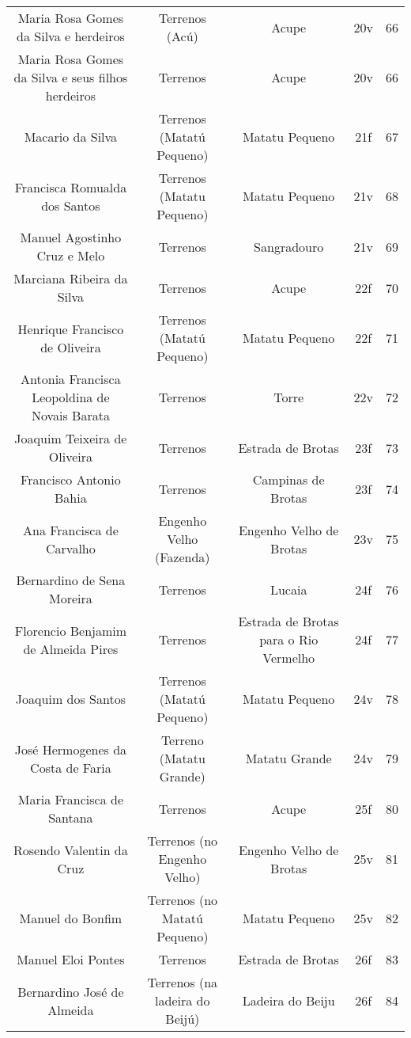 \begin{table}[!htp]
{\begin{tiny}
\begin{tabular}{ccccc}
Maria Rosa Gomes da Silva e herdeiros						&Terrenos (Acú)				&Acupe					&20v			&66			&\\
Maria Rosa Gomes da Silva e seus filhos herdeiros				&Terrenos				&Acupe					&20v			&66			&\\
Macario da Silva								&Terrenos (Matatú Pequeno)		&Matatu Pequeno				&21f			&67			&\\
Francisca Romualda dos Santos							&Terrenos (Matatu Pequeno)		&Matatu Pequeno				&21v			&68			&\\
Manuel Agostinho Cruz e Melo							&Terrenos				&Sangradouro				&21v			&69			&\\
Marciana Ribeira da Silva							&Terrenos				&Acupe					&22f			&70			&\\
Henrique Francisco de Oliveira							&Terrenos (Matatú Pequeno)		&Matatu Pequeno				&22f			&71			&\\
Antonia Francisca Leopoldina de Novais Barata					&Terrenos				&Torre					&22v			&72			&\\
Joaquim Teixeira de Oliveira							&Terrenos				&Estrada de Brotas			&23f			&73			&\\
Francisco Antonio Bahia								&Terrenos				&Campinas de Brotas			&23f			&74			&\\
Ana Francisca de Carvalho							&Engenho Velho (Fazenda)		&Engenho Velho de Brotas		&23v			&75			&\\
Bernardino de Sena Moreira							&Terrenos				&Lucaia					&24f			&76			&\\
Florencio Benjamim de Almeida Pires						&Terrenos				&Estrada de Brotas para o Rio Vermelho	&24f			&77			&\\
Joaquim dos Santos								&Terrenos (Matatú Pequeno)		&Matatu Pequeno				&24v			&78			&\\
José Hermogenes da Costa de Faria						&Terreno (Matatu Grande)		&Matatu Grande				&24v			&79			&\\
Maria Francisca de Santana							&Terrenos				&Acupe					&25f			&80			&\\
Rosendo Valentin da Cruz							&Terrenos (no Engenho Velho)		&Engenho Velho de Brotas		&25v			&81			&\\
Manuel do Bonfim								&Terrenos (no Matatú Pequeno)		&Matatu Pequeno				&25v			&82			&\\
Manuel Eloi Pontes								&Terrenos				&Estrada de Brotas			&26f			&83			&\\
Bernardino José de Almeida							&Terrenos (na ladeira do Beijú)		&Ladeira do Beiju			&26f			&84			&\\

\end{tabular}
\end{tiny}}
\end{table}
